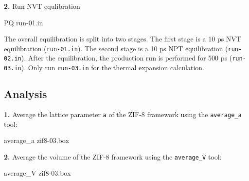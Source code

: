 \documentclass[
  letterpaper,
]{article}
\newenvironment{Shaded}{\begin{snugshade}}{\end{snugshade}}
\newcommand{\ExtensionTok}[1]{\textcolor[rgb]{0.00,0.23,0.31}{#1}}
\newcommand{\NormalTok}[1]{\textcolor[rgb]{0.00,0.23,0.31}{#1}}
\begin{document}
\textbf{2.} Run NVT equlibration

\begin{Shaded}
\begin{Highlighting}[]
\ExtensionTok{PQ}\NormalTok{ run{-}01.in}
\end{Highlighting}
\end{Shaded}

\begin{tcolorbox}[enhanced jigsaw, opacitybacktitle=0.6, colback=white, rightrule=.15mm, bottomrule=.15mm, coltitle=black, toprule=.15mm, bottomtitle=1mm, arc=.35mm, colframe=quarto-callout-note-color-frame, opacityback=0, toptitle=1mm, breakable, titlerule=0mm, left=2mm, title=\textcolor{quarto-callout-note-color}{\faInfo}\hspace{0.5em}{Note}, leftrule=.75mm, colbacktitle=quarto-callout-note-color!10!white]

The overall equilibration is split into two stages. The first stage is a
10 ps NVT equilibration (\texttt{run-01.in}). The second stage is a 10
ps NPT equilibration (\texttt{run-02.in}). After the equilibration, the
production run is performed for 500 ps (\texttt{run-03.in}). Only run
\texttt{run-03.in} for the thermal expansion calculation.

\end{tcolorbox}

\hypertarget{analysis}{%
\subsection*{Analysis}\label{analysis}}


\textbf{1.} Average the lattice parameter \texttt{a} of the ZIF-8
framework using the \texttt{average\_a} tool:

\begin{Shaded}
\begin{Highlighting}[]
\ExtensionTok{average\_a}\NormalTok{ zif8{-}03.box}
\end{Highlighting}
\end{Shaded}

\textbf{2.} Average the volume of the ZIF-8 framework using the
\texttt{average\_V} tool:

\begin{Shaded}
\begin{Highlighting}[]
\ExtensionTok{average\_V}\NormalTok{ zif8{-}03.box}
\end{Highlighting}
\end{Shaded}
\end{document}
